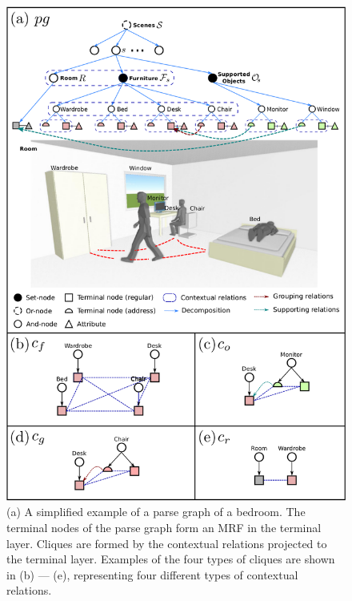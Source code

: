 \documentclass[10pt]{article}
\begin{document}
\setcounter{figure}{2}
\begin{figure}[!htpb]
  \centering
  \includegraphics[width=0.6\linewidth]{fig_3.png}
  \caption{(a) A simplified example of a parse graph of a bedroom. The terminal
    nodes of the parse graph form an MRF in the terminal layer. Cliques are
    formed by the contextual relations projected to the terminal layer.
    Examples of the four types of cliques are shown in (b) --- (e),
    representing four different types of contextual relations.}%
  \label{fig:3}
\end{figure}


\newpage
\end{document}
